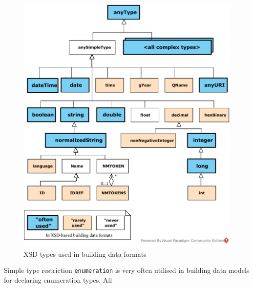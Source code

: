 \begin{figure}
    \centering    
    \includegraphics[width=\columnwidth]{images/xsd-type-hierarchy-8.pdf}
     \caption{XSD types used in building data formats}
    \label{fig:xsd-type-hierarchy}
\end{figure}




Simple type restriction \texttt{enumeration} is very often utilised in building data models for declaring enumeration types.
All 




